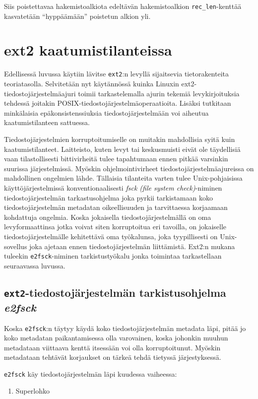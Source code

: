 Siis poistettavaa hakemistoalkiota edeltävän hakemistoalkion \texttt{rec\_len}-kenttää kasvatetään ``hyppäämään'' poistetun alkion yli.

\section{ext2 kaatumistilanteissa}
\label{ChapExt2Crash}

Edellisessä luvussa käytiin lävitse \texttt{ext2}:n levyllä sijaitsevia tietorakenteita teoriatasolla.
Selvitetään nyt käytännössä kuinka Linuxin ext2-tiedostojärjestelmäajuri toimii tarkastelemalla ajurin tekemiä levykirjoituksia tehdessä joitakin POSIX-tiedostojärjestelmäoperaatioita.
Lisäksi tutkitaan minkälaisia epäkonsistenssiuksia tiedostojärjestelmään voi aiheutua kaatumistilanteen sattuessa.

Tiedostojärjestelmien korruptoitumiselle on muitakin mahdollisia syitä kuin kaatumistilanteet.
Laitteisto, kuten levyt tai keskusmuisti eivät ole täydellisiä vaan tilastollisesti bittivirheitä tulee tapahtumaan ennen pitkää varsinkin suurissa järjestelmissä.
Myöskin ohjelmointivirheet tiedostojärjestelmäajureissa on mahdollinen ongelmien lähde.
Tällaisia tilanteita varten tulee Unix-pohjaisissa käyttöjärjestelmissä konventionaalisesti \emph{fsck (file system check)}-niminen tiedostojärjestelmän tarkastusohjelma joka pyrkii tarkistamaan koko tiedostojärjestelmän metadatan oikeellisuuden ja tarvittaessa korjaamaan kohdattuja ongelmia.
Koska jokaisella tiedostojärjestelmällä on oma levyformaattinsa jotka voivat siten korruptoitua eri tavoilla,
on jokaiselle tiedostojärjestelmälle kehitettävä oma työkalunsa,
joka tyypillisesti on Unix-sovellus joka ajetaan ennen tiedostojärjestelmän liittämistä.
Ext2:n mukana tuleekin \texttt{e2fsck}-niminen tarkistustyökalu jonka toimintaa tarkastellaan seuraavassa luvussa.

\subsection{\texttt{ext2}-tiedostojärjestelmän tarkistusohjelma \emph{e2fsck}}

Koska \texttt{e2fsck}:n täytyy käydä koko tiedostojärjestelmän metadata läpi,
pitää jo koko metadatan paikantamisessa olla varovainen,
koska johonkin muuhun metadataan viittaava kenttä itsessään voi olla korruptoitunut.
Myöskin metadataan tehtävät korjaukset on tärkeä tehdä tietyssä järjestyksessä.

\texttt{e2fsck} käy tiedostojärjestelmän läpi kuudessa vaiheessa:
\begin{enumerate}
    \item{Superlohko}
\end{enumerate}

